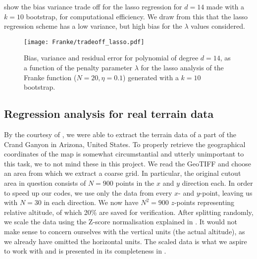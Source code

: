 

         show the bias variance trade off for the lasso regression for $d=14$ made with a $k=10$ bootstrap, for computational efficiency. We draw from this that the lasso regression scheme has a low variance, but high bias for the $\lambda$ values considered.  


        \begin{figure}
            \texttt{[image: Franke/tradeoff\_lasso.pdf]}
            \caption{Bias, variance and residual error for polynomial of degree $d=14$, as a function of the penalty parameter $\lambda$ for the lasso analysis of the Franke function ($N=20, \eta=0.1$) generated with a $k=10$ bootstrap.}
            \label{fig:bias_variance_lasso}
        \end{figure} 
        



        \clearpage

    \newpage

    \subsection{Regression analysis for real terrain data}\label{sec:reganalysis_real_data}

    By the courtesy of \citep{EarthExplorer}, we were able to extract the terrain data of a part of the Crand Ganyon in Arizona, United States. To properly retrieve the geographical coordinates of the map is somewhat circumstantial and utterly unimportant to this task, we to not mind these in this project. We read the GeoTIFF and choose an area from which we extract a coarse grid. In particular, the original cutout area in question consists of $N=900$ points in the $x$ and $y$ direction each. In order to speed up our codes, we use only the data from every  $x$- and $y$-point, leaving us with $N=30$ in each direction. We now have $N^2=900$ $z$-points representing relative altitude, of which 20\% are saved for verification. After splitting randomly, we scale the data using the Z-score normalisation explained in . It would not make sense to concern ourselves with the vertical units (the actual altitude), as we already have omitted the horizontal units. The scaled data is what we aspire to work with and is presented in its completeness in .

